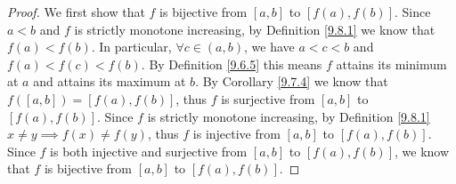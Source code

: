 \begin{proof}
    We first show that \(f\) is bijective from \([a, b]\) to \([f(a), f(b)]\).
    Since \(a < b\) and \(f\) is strictly monotone increasing, by Definition \ref{9.8.1} we know that \(f(a) < f(b)\).
    In particular, \(\forall c \in (a, b)\), we have \(a < c < b\) and \(f(a) < f(c) < f(b)\).
    By Definition \ref{9.6.5} this means \(f\) attains its minimum at \(a\) and attains its maximum at \(b\).
    By Corollary \ref{9.7.4} we know that \(f([a, b]) = [f(a), f(b)]\), thus \(f\) is surjective from \([a, b]\) to \([f(a), f(b)]\).
    Since \(f\) is strictly monotone increasing, by Definition \ref{9.8.1} \(x \neq y \implies f(x) \neq f(y)\), thus \(f\) is injective from \([a, b]\) to \([f(a), f(b)]\).
    Since \(f\) is both injective and surjective from \([a, b]\) to \([f(a), f(b)]\), we know that \(f\) is bijective from \([a, b]\) to \([f(a), f(b)]\).


\end{proof}
